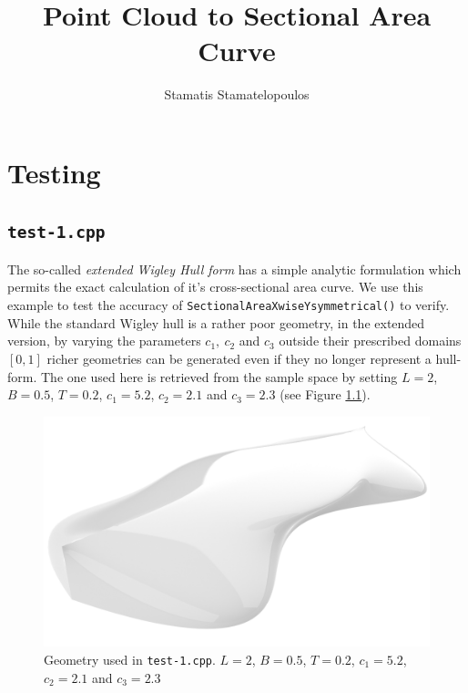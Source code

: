 \documentclass{report}
\title{Point Cloud to Sectional Area Curve}
\author{Stamatis Stamatelopoulos}
\begin{document}
\maketitle
 
\tableofcontents

\chapter{Testing}

\section{\texttt{test-1.cpp}}\label{sec:test-1}

\newpar The so-called {\it extended Wigley Hull form} \parencite{journee1992experiments} has a 
simple analytic formulation which permits the exact calculation
of it's cross-sectional area curve. We use this example to test 
the accuracy of \texttt{SectionalAreaXwiseYsymmetrical()} to verify. While the standard
Wigley hull is a rather poor geometry, in the extended version, 
by varying the parameters $c_1,\ c_2$ and $c_3$ outside their
prescribed domains $[0,1]$ richer geometries can be generated
even if they no longer represent a hull-form. The one used here is 
retrieved from the sample space by setting $L = 2$, $B=0.5$, $T = 0.2$, 
$c_1 = 5.2$, $c_2 = 2.1$ and $c_3 = 2.3$ (see Figure \ref{fig:test-1-wigley-render}).
\begin{figure}[H]
    \centering
    \includegraphics[width=1.0\linewidth]{figures/test-1-wigley-render.png}
    \caption{Geometry used in \texttt{test-1.cpp}. $L = 2$, $B=0.5$, $T = 0.2$, 
    $c_1 = 5.2$, $c_2 = 2.1$ and $c_3 = 2.3$}
    \label{fig:test-1-wigley-render}
\end{figure}
\end{document}
